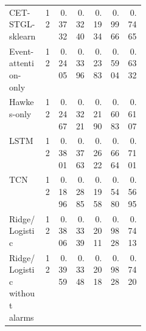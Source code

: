 \begin{longtable}{@{}p{0.26\linewidth}rrrrrr@{}}
CET-STGL-sklearn & 12 & 0.3732 & 0.3240 & 0.1934 & 0.9966 & 0.7465 \\
Event-attention-only & 12 & 0.2405 & 0.3396 & 0.2383 & 0.5904 & 0.6332 \\
Hawkes-only & 12 & 0.2467 & 0.3221 & 0.2190 & 0.6083 & 0.6107 \\
LSTM & 12 & 0.3801 & 0.3763 & 0.2622 & 0.6664 & 0.7101 \\
TCN & 12 & 0.1896 & 0.2885 & 0.1958 & 0.5480 & 0.5695 \\
Ridge/Logistic & 12 & 0.3806 & 0.3339 & 0.2011 & 0.9828 & 0.7413 \\
Ridge/Logistic without alarms & 12 & 0.3959 & 0.3348 & 0.2018 & 0.9828 & 0.7420 \\
\bottomrule
\end{longtable}
\endgroup

